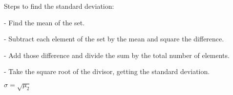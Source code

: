 \documentclass[a4paper,12pt]{article}
\begin{document}
\begin{description}
\item {Steps to find the standard deviation:}
\item { - Find the mean of the set.}
\item { - Subtract each element of the set by the mean and square the difference.}
\item { - Add those difference and divide the sum by the total number of elements.}
\item { - Take the square root of the divisor, getting the standard deviation.}
\end{description}
$\sigma = \sqrt {\mu _2 }$
\end{document}
